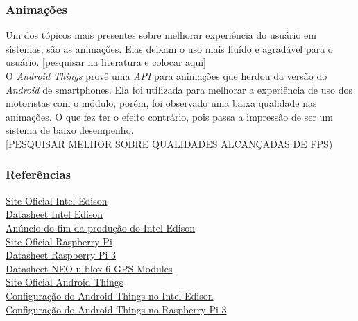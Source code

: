 \documentclass[
	12pt,				%
	oneside,			%
	a4paper,			%
	brazil				%
]{abntex2}
\begin{document}
\subsubsection{Animações}

Um dos tópicos mais presentes sobre melhorar experiência do usuário em sistemas, são as animações. Elas deixam o uso mais fluído e agradável para o usuário. [pesquisar na literatura e colocar aqui]\\

O \textit{Android Things} provê uma \textit{API} para animações que herdou da versão do \textit{Android} de smartphones. Ela foi utilizada para melhorar a experiência de uso dos motoristas com o módulo, porém, foi observado uma baixa qualidade nas animações. O que fez ter o efeito contrário, pois passa a impressão de ser um sistema de baixo desempenho.\\

[PESQUISAR MELHOR SOBRE QUALIDADES ALCANÇADAS DE FPS)

\subsubsection{Referências}

\href{https://software.intel.com/en-us/iot/hardware/edison}{Site Oficial Intel Edison}\\
\href{http://download.intel.com/support/edison/sb/edisonmodule_hg_331189004.pdf}{Datasheet Intel Edison}\\
\href{https://www.embarcados.com.br/placas-intel-edison-galileo-e-joule-serao-descontinuadas/}{Anúncio do fim da produção do Intel Edison}\\
\href{https://www.raspberrypi.org/products/raspberry-pi-3-model-b/}{Site Oficial Raspberry Pi}\\
\href{https://www.raspberrypi.org/documentation/hardware/computemodule/RPI-CM-DATASHEET-V1_0.pdf}{Datasheet Raspberry Pi 3}\\
\href{https://www.u-blox.com/sites/default/files/products/documents/NEO-6_DataSheet_(GPS.G6-HW-09005).pdf}{Datasheet NEO u-blox 6 GPS Modules}\\
\href{https://developer.android.com/things/index.html}{Site Oficial Android Things}\\
\href{https://developer.android.com/things/hardware/edison.html}{Configuração do Android Things no Intel Edison}\\
\href{https://developer.android.com/things/hardware/raspberrypi.html}{Configuração do Android Things no Raspberry Pi 3}\\
\end{document}
